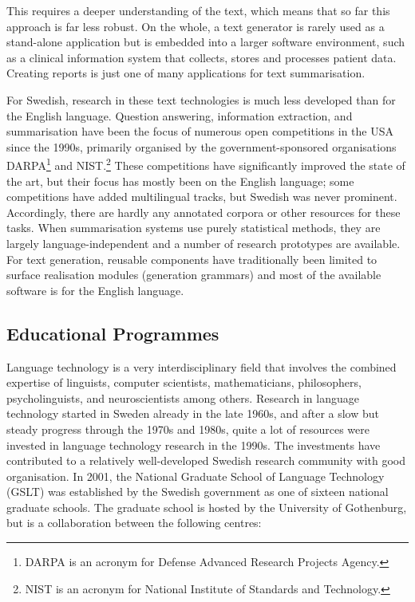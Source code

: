 \begin{multicols}{2}

This requires a deeper understanding of the text, which means that so far this approach is far less robust. On the whole, a text generator is rarely used as a stand-alone application but is embedded into a larger software environment, such as a clinical information system that collects, stores and processes patient data. Creating reports is just one of many applications for text summarisation. 

For Swedish, research in these text technologies is much less developed than for the English language. Question answering, information extraction, and summarisation have been the focus of numerous open competitions in the USA since the 1990s, primarily organised by the government-sponsored organisations DARPA\footnote{DARPA is an acronym for Defense Advanced Research Projects Agency.} and NIST.\footnote{NIST is an acronym for National Institute of Standards and Technology.} These competitions have significantly improved the state of the art, but their focus has mostly been on the English language; some competitions have added multilingual tracks, but Swedish was never prominent. Accordingly, there are hardly any annotated corpora or other resources for these tasks. When summarisation systems use purely statistical methods, they are largely language-independent and a number of research prototypes are available. For text generation, reusable components have traditionally been limited to surface realisation modules (generation grammars) and most of the available software is for the English language.

\subsection{Educational Programmes}

Language technology is a very interdisciplinary field that involves
the combined expertise of linguists, computer scientists,
mathematicians, philosophers, psycholinguists, and neuroscientists
among others. Research in language technology started in Sweden
already in the late 1960s, and after a slow but steady progress
through the 1970s and 1980s, quite a lot of resources were invested in
language technology research in the 1990s. The investments have
contributed to a relatively well-developed Swedish research community
with good organisation. In 2001, the National Graduate School of
Language Technology (GSLT) was established by the Swedish government
as one of sixteen national graduate schools. The graduate school is
hosted by the University of Gothenburg, but is a collaboration between
the following centres:


\end{multicols}
